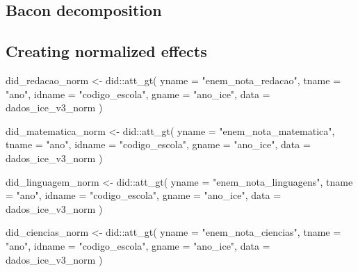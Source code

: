 \documentclass[
  letterpaper,
  DIV=11,
  numbers=noendperiod]{scrartcl}
\newenvironment{Shaded}{\begin{snugshade}}{\end{snugshade}}
\newcommand{\AttributeTok}[1]{\textcolor[rgb]{0.40,0.45,0.13}{#1}}
\newcommand{\FunctionTok}[1]{\textcolor[rgb]{0.28,0.35,0.67}{#1}}
\newcommand{\NormalTok}[1]{\textcolor[rgb]{0.00,0.23,0.31}{#1}}
\newcommand{\OtherTok}[1]{\textcolor[rgb]{0.00,0.23,0.31}{#1}}
\newcommand{\SpecialCharTok}[1]{\textcolor[rgb]{0.37,0.37,0.37}{#1}}
\newcommand{\StringTok}[1]{\textcolor[rgb]{0.13,0.47,0.30}{#1}}
\begin{document}
\subsection{Bacon decomposition}\label{bacon-decomposition}

\subsection{Creating normalized
effects}\label{creating-normalized-effects}

\begin{Shaded}
\begin{Highlighting}[]
\NormalTok{did\_redacao\_norm }\OtherTok{\textless{}{-}}\NormalTok{ did}\SpecialCharTok{::}\FunctionTok{att\_gt}\NormalTok{(}
  \AttributeTok{yname =} \StringTok{"enem\_nota\_redacao"}\NormalTok{,}
  \AttributeTok{tname =} \StringTok{"ano"}\NormalTok{,}
  \AttributeTok{idname =} \StringTok{"codigo\_escola"}\NormalTok{,}
  \AttributeTok{gname =} \StringTok{"ano\_ice"}\NormalTok{, }
  \AttributeTok{data =}\NormalTok{ dados\_ice\_v3\_norm}
\NormalTok{)}

\NormalTok{did\_matematica\_norm }\OtherTok{\textless{}{-}}\NormalTok{ did}\SpecialCharTok{::}\FunctionTok{att\_gt}\NormalTok{(}
  \AttributeTok{yname =} \StringTok{"enem\_nota\_matematica"}\NormalTok{,}
  \AttributeTok{tname =} \StringTok{"ano"}\NormalTok{,}
  \AttributeTok{idname =} \StringTok{"codigo\_escola"}\NormalTok{,}
  \AttributeTok{gname =} \StringTok{"ano\_ice"}\NormalTok{,}
  \AttributeTok{data =}\NormalTok{ dados\_ice\_v3\_norm}
\NormalTok{)}

\NormalTok{did\_linguagem\_norm }\OtherTok{\textless{}{-}}\NormalTok{ did}\SpecialCharTok{::}\FunctionTok{att\_gt}\NormalTok{(}
  \AttributeTok{yname =} \StringTok{"enem\_nota\_linguagens"}\NormalTok{,}
  \AttributeTok{tname =} \StringTok{"ano"}\NormalTok{,}
  \AttributeTok{idname =} \StringTok{"codigo\_escola"}\NormalTok{,}
  \AttributeTok{gname =} \StringTok{"ano\_ice"}\NormalTok{,}
  \AttributeTok{data =}\NormalTok{ dados\_ice\_v3\_norm}
\NormalTok{)}

\NormalTok{did\_ciencias\_norm }\OtherTok{\textless{}{-}}\NormalTok{ did}\SpecialCharTok{::}\FunctionTok{att\_gt}\NormalTok{(}
  \AttributeTok{yname =} \StringTok{"enem\_nota\_ciencias"}\NormalTok{,}
  \AttributeTok{tname =} \StringTok{"ano"}\NormalTok{,}
  \AttributeTok{idname =} \StringTok{"codigo\_escola"}\NormalTok{,}
  \AttributeTok{gname =} \StringTok{"ano\_ice"}\NormalTok{,}
  \AttributeTok{data =}\NormalTok{ dados\_ice\_v3\_norm}
\NormalTok{)}


\end{Highlighting}
\end{Shaded}
\end{document}

